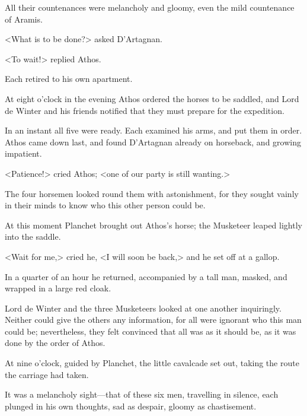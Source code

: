 All their countenances were melancholy and gloomy, even the mild countenance of Aramis. 

<What is to be done?> asked D'Artagnan. 

<To wait!> replied Athos. 

Each retired to his own apartment. 

At eight o'clock in the evening Athos ordered the horses to be saddled, and Lord de Winter and his friends notified that they must prepare for the expedition. 

In an instant all five were ready. Each examined his arms, and put them in order. Athos came down last, and found D'Artagnan already on horseback, and growing impatient. 

<Patience!> cried Athos; <one of our party is still wanting.> 

The four horsemen looked round them with astonishment, for they sought vainly in their minds to know who this other person could be. 

At this moment Planchet brought out Athos's horse; the Musketeer leaped lightly into the saddle. 

<Wait for me,> cried he, <I will soon be back,> and he set off at a gallop. 

In a quarter of an hour he returned, accompanied by a tall man, masked, and wrapped in a large red cloak. 

Lord de Winter and the three Musketeers looked at one another inquiringly. Neither could give the others any information, for all were ignorant who this man could be; nevertheless, they felt convinced that all was as it should be, as it was done by the order of Athos. 

At nine o'clock, guided by Planchet, the little cavalcade set out, taking the route the carriage had taken. 

It was a melancholy sight—that of these six men, travelling in silence, each plunged in his own thoughts, sad as despair, gloomy as chastisement.